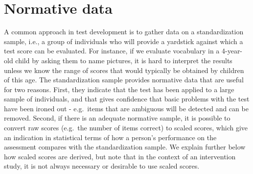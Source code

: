 \documentclass{krantz}
\begin{document}
\hypertarget{normative-data}{%
\section{Normative data}\label{normative-data}}
A common approach in test development is to gather data on a standardization sample, i.e., a group of individuals who will provide a yardstick against which a test score can be evaluated. For instance, if we evaluate vocabulary in a 4-year-old child by asking them to name pictures, it is hard to interpret the results unless we know the range of scores that would typically be obtained by children of this age. The standardization sample provides normative data that are useful for two reasons. First, they indicate that the test has been applied to a large sample of individuals, and that gives confidence that basic problems with the test have been ironed out - e.g.~items that are ambiguous will be detected and can be removed. Second, if there is an adequate normative sample, it is possible to convert raw scores (e.g.~the number of items correct) to scaled scores, which give an indication in statistical terms of how a person's performance on the assessment compares with the standardization sample. We explain further below how scaled scores are derived, but note that in the context of an intervention study, it is not always necessary or desirable to use scaled scores.
\end{document}
